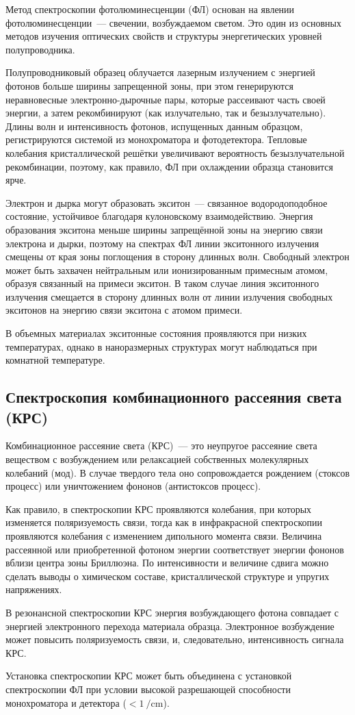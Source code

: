 Метод спектроскопии фотолюминесценции (ФЛ) основан на явлении фотолюминесценции~--- свечении, возбуждаемом светом. Это один из основных методов изучения оптических свойств и структуры энергетических уровней полупроводника.

Полупроводниковый образец облучается лазерным излучением с энергией фотонов больше ширины запрещенной зоны, при этом генерируются неравновесные электронно-дырочные пары, которые рассеивают часть своей энергии, а затем рекомбинируют (как излучательно, так и безызлучательно). Длины волн и интенсивность фотонов, испущенных данным образцом, регистрируются системой из монохроматора и фотодетектора. Тепловые колебания кристаллической решётки увеличивают вероятность безызлучательной рекомбинации, поэтому, как правило, ФЛ при охлаждении образца становится ярче.

Электрон и дырка могут образовать экситон~--- связанное водородоподобное состояние, устойчивое благодаря кулоновскому взаимодействию. Энергия образования экситона меньше ширины запрещённой зоны на энергию связи электрона и дырки, поэтому на спектрах ФЛ линии экситонного излучения смещены от края зоны поглощения в сторону длинных волн. Свободный электрон может быть захвачен нейтральным или ионизированным примесным атомом, образуя связанный на примеси экситон. В таком случае линия экситонного излучения смещается в сторону длинных волн от линии излучения свободных экситонов на энергию связи экситона с атомом примеси.

В объемных материалах экситонные состояния проявляются при низких температурах, однако в наноразмерных структурах могут наблюдаться при комнатной температуре.

\subsection{Спектроскопия комбинационного рассеяния света (КРС)}\label{subsec:ch2/sec2/sub4}

Комбинационное рассеяние света (КРС)~--- это неупругое рассеяние света веществом с возбуждением или релаксацией собственных молекулярных колебаний (мод). В случае твердого тела оно сопровождается рождением (стоксов процесс) или уничтожением фононов (антистоксов процесс).

Как правило, в спектроскопии КРС проявляются колебания, при которых изменяется поляризуемость связи, тогда как в инфракрасной спектроскопии проявляются колебания с изменением дипольного момента связи. Величина рассеянной или приобретенной фотоном энергии соответствует энергии фононов вблизи центра зоны Бриллюэна. По интенсивности и величине сдвига можно сделать выводы о химическом составе, кристаллической структуре и упругих напряжениях.

В резонансной спектроскопии КРС энергия возбуждающего фотона совпадает с энергией электронного перехода материала образца. Электронное возбуждение может повысить поляризуемость связи, и, следовательно, интенсивность сигнала КРС.

Установка спектроскопии КРС может быть объединена с установкой спектроскопии ФЛ при условии высокой разрешающей способности монохроматора и детектора (\(< 1~\si{\per\centi\meter}\)).

\FloatBarrier